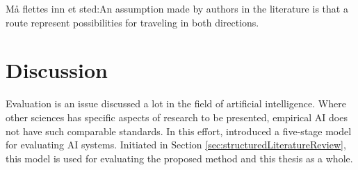 Må flettes inn et sted:An assumption made by authors in the literature is that a route represent possibilities for traveling in both directions.

\section{Discussion}


Evaluation is an issue discussed a lot in the field of artificial intelligence. Where other sciences has specific aspects of research to be presented, empirical AI does not have such comparable standards. In this effort, \citet{cohen88} introduced a five-stage model for evaluating AI systems. Initiated in Section \vref{sec:structuredLiteratureReview}, this model is used for evaluating the proposed method and this thesis as a whole. %




